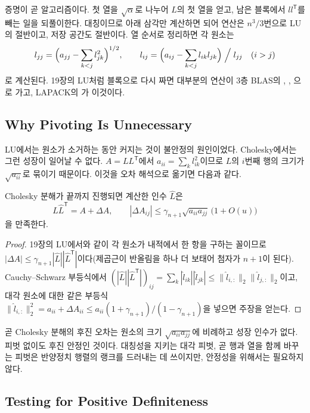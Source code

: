 증명이 곧 알고리즘이다. 첫 열을 $\sqrt{\alpha}$로 나누어 $L$의 첫 열을 얻고, 남은 블록에서 $ll^{\mathsf T}$를 빼는 일을 되풀이한다. 대칭이므로 아래 삼각만 계산하면 되어 연산은 $n^3/3$번으로 LU의 절반이고, 저장 공간도 절반이다. 열 순서로 정리하면 각 원소는
\[
l_{jj}=\Bigl(a_{jj}-\sum_{k<j}l_{jk}^2\Bigr)^{1/2},\qquad l_{ij}=\Bigl(a_{ij}-\sum_{k<j}l_{ik}l_{jk}\Bigr)\Bigm/l_{jj}\quad(i>j)
\]
로 계산된다. 19장의 LU처럼 블록으로 다시 짜면 대부분의 연산이 3층 BLAS의 , , 으로 가고, LAPACK의 가 이것이다.

\subsection{Why Pivoting Is Unnecessary}

LU에서는 원소가 소거하는 동안 커지는 것이 불안정의 원인이었다. Cholesky에서는 그런 성장이 일어날 수 없다. $A=LL^{\mathsf T}$에서 $a_{ii}=\sum_k l_{ik}^2$이므로 $L$의 $i$번째 행의 크기가 $\sqrt{a_{ii}}$로 묶이기 때문이다. 이것을 오차 해석으로 옮기면 다음과 같다.

\begin{theorem}
\label{thm:cholesky-backward}
Cholesky 분해가 끝까지 진행되면 계산한 인수 $\hat L$은
\[
\hat L\hat L^{\mathsf T}=A+\Delta A,\qquad|\Delta A_{ij}|\le\gamma_{n+1}\sqrt{a_{ii}a_{jj}}\,\bigl(1+O(u)\bigr)
\]
을 만족한다.
\end{theorem}

\begin{proof}
19장의 LU에서와 같이 각 원소가 내적에서 한 항을 구하는 꼴이므로 $|\Delta A|\le\gamma_{n+1}|\hat L||\hat L^{\mathsf T}|$이다(제곱근이 반올림을 하나 더 보태어 첨자가 $n+1$이 된다). Cauchy--Schwarz 부등식에서 $(|\hat L||\hat L^{\mathsf T}|)_{ij}=\sum_k|\hat l_{ik}||\hat l_{jk}|\le\|\hat l_{i,:}\|_2\|\hat l_{j,:}\|_2$이고, 대각 원소에 대한 같은 부등식 $\|\hat l_{i,:}\|_2^2=a_{ii}+\Delta A_{ii}\le a_{ii}(1+\gamma_{n+1})/(1-\gamma_{n+1})$을 넣으면 주장을 얻는다.
\end{proof}

곧 Cholesky 분해의 후진 오차는 원소의 크기 $\sqrt{a_{ii}a_{jj}}$에 비례하고 성장 인수가 없다. 피벗 없이도 후진 안정인 것이다. 대칭성을 지키는 대각 피벗, 곧 행과 열을 함께 바꾸는 피벗은 반양정치 행렬의 랭크를 드러내는 데 쓰이지만, 안정성을 위해서는 필요하지 않다.

\subsection{Testing for Positive Definiteness}

